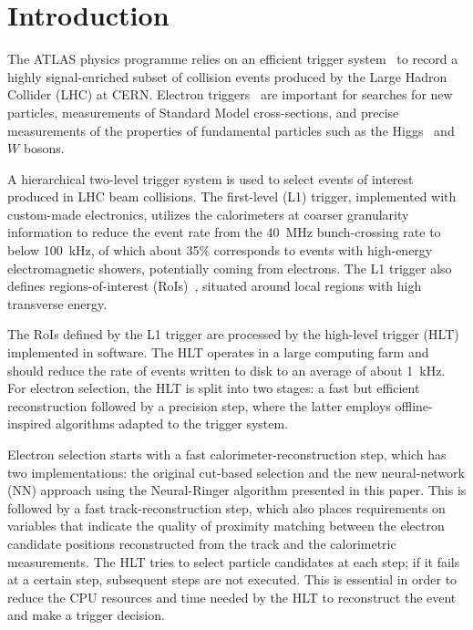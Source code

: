 \section{Introduction}


The ATLAS physics programme relies on an efficient trigger system~\cite{TRIG-2016-01} to record a highly signal-enriched subset of collision events produced by the Large Hadron Collider (LHC) at CERN. Electron triggers~\cite{TRIG-2018-05} are important for searches for new particles, measurements of Standard Model cross-sections, and precise measurements of the properties of fundamental particles such as the Higgs~\cite{HIGG-2012-27,HIGG-2016-33} and $W$ bosons.

A hierarchical two-level trigger system is used to select events of interest produced in LHC beam collisions. The first-level (L1) trigger, implemented with custom-made electronics, utilizes the calorimeters at coarser granularity information to reduce the event rate from the 40~MHz bunch-crossing rate to below 100~kHz, of which about 35\% corresponds to events with high-energy electromagnetic showers, potentially coming from electrons. The L1 trigger also defines regions-of-interest (RoIs)~\cite{TRIG-2018-01}, situated around local regions with high transverse energy. 

The RoIs defined by the L1 trigger are processed by the high-level trigger (HLT) implemented in software. The HLT operates in a large computing farm and should reduce the rate of events written to disk to an average of about 1~kHz.
For electron selection, the HLT is split into two stages: a fast but efficient reconstruction followed by a precision step, where the latter employs offline-inspired algorithms adapted to the trigger system.


 Electron selection starts with a fast calorimeter-reconstruction step, which has two implementations: the original cut-based selection and the new neural-network (NN) approach using the Neural-Ringer algorithm presented in this paper. This is followed by a fast track-reconstruction step, which also places requirements on variables that indicate the quality of proximity matching between the electron candidate positions reconstructed from the track and the calorimetric measurements. The HLT tries to select particle candidates at each step; if it fails at a certain step, subsequent steps are not executed. This is essential in order to reduce the CPU resources and time needed by the HLT to reconstruct the event and make a trigger decision. 





